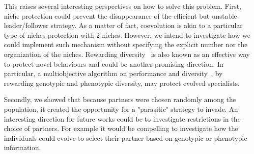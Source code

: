   This raises several interesting perspectives on how to solve this problem. First, niche protection could prevent the disappearance of the efficient but unstable leader/follower strategy. As a matter of fact, coevolution is akin to a particular type of niches protection with $2$ niches. However, we intend to investigate how we could implement such mechanism without specifying the explicit number nor the organization of the niches. Rewarding diversity~\parencite{Lehman2008} is also known as an effective way to protect novel behaviours and could be another promising direction. In particular, a multiobjective algorithm on performance and diversity~\parencite{Doncieux2014}, by rewarding genotypic and phenotypic diversity, may protect evolved specialists.

  Secondly, we showed that because partners were chosen randomly among the population, it created the opportunity for a "parasitic" strategy to invade. An interesting direction for future works could be to investigate restrictions in the choice of partners. For example it would be compelling to investigate how the individuals could evolve to select their partner based on genotypic or phenotypic information.